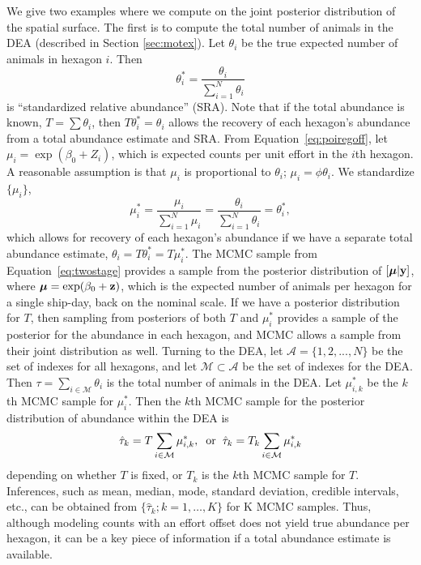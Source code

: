 \documentclass[11pt, titlepage]{article}
\begin{document}
\begin{spacing}{1.9}
\begin{flushleft}
We give two examples where we compute on the joint posterior distribution of the spatial surface.  The first is to compute the total number of animals in the DEA (described in Section \ref{sec:motex}). Let $\theta_{i}$ be the true expected number of animals in hexagon $i$.  Then
\[
\theta^{*}_{i} = \frac{\theta_{i}}{\sum_{i=1}^{N}\theta_{i}}
\]
is ``standardized relative abundance'' (SRA). Note that if the total abundance is known, $T = \sum \theta_{i}$, then $T\theta^{*}_{i} = \theta_{i}$ allows the recovery of each hexagon's abundance from a total abundance estimate and SRA. From Equation~\eqref{eq:poiregoff}, let $\mu_{i} =\exp(\beta_{0} + Z_{i})$, which is expected counts per unit effort in the $i$th hexagon. A reasonable assumption is that $\mu_{i}$ is proportional to $\theta_{i}$; $\mu_{i} = \phi\theta_{i}$.  We standardize $\{\mu_i\}$,
\[
\mu^{*}_{i} = \frac{\mu_{i}}{\sum_{i=1}^{N}\mu_{i}}  = \frac{\theta_{i}}{\sum_{i=1}^{N}\theta_{i}} = \theta_{i}^{*},
\]
which allows for recovery of each hexagon's abundance if we have a separate total abundance estimate, $\theta_{i} = T\theta^{*}_{i} = T\mu^{*}_{i}$.  The MCMC sample from Equation~\eqref{eq:twostage} provides a sample from the posterior distribution of $[\mbox{\boldmath $\mu$}|\mathbf{y}]$, where $\mbox{\boldmath $\mu$} = \exp(\beta_{0} + \mathbf{z})$, which is the expected number of animals per hexagon for a single ship-day, back on the nominal scale. If we have a posterior distribution for $T$, then sampling from posteriors of both $T$ and $\mu^{*}_{i}$ provides a sample of the posterior for the abundance in each hexagon, and MCMC allows a sample from their joint distribution as well. Turning to the DEA, let $\mathcal{A} = \{1,2,...,N\}$ be the set of indexes for all hexagons, and let $\mathcal{M} \subset \mathcal{A}$ be the set of indexes for the DEA. Then $\tau = \sum_{i \in \mathcal{M}} \theta_{i}$ is the total number of animals in the DEA. Let $\mu^{*}_{i,k}$ be the $k$th MCMC sample for $\mu^{*}_{i}$.  Then the $k$th MCMC sample for the posterior distribution of abundance within the DEA is
\begin{equation} \label{eq:spexlicitabu}
\hat{\tau}_{k} = T\sum_{i \in \mathcal{M}}\mu^{*}_{i,k}, \hspace{.2cm} \textrm{or} \hspace{.2cm}\hat{\tau}_{k}= T_{k}\sum_{i \in \mathcal{M}}\mu^{*}_{i,k}
\end{equation}
depending on whether $T$ is fixed, or $T_{k}$ is the $k$th MCMC sample for $T$. Inferences, such as mean, median, mode, standard deviation, credible intervals, etc., can be obtained from $\{\hat{\tau}_{k}; k = 1,\ldots,K\}$ for K MCMC samples. Thus, although modeling counts with an effort offset does not yield true abundance per hexagon, it can be a key piece of information if a total abundance estimate is available. 


\end{flushleft}
\end{spacing}
\end{document}
